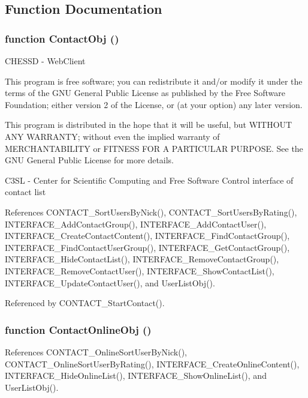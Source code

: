 \subsection{Function Documentation}
\subsubsection{\setlength{\rightskip}{0pt plus 5cm}function ContactObj ()}\label{interface_2contact_8js_befba56b856674055a8dfddbbbb0e72c}


CHESSD - WebClient

This program is free software; you can redistribute it and/or modify it under the terms of the GNU General Public License as published by the Free Software Foundation; either version 2 of the License, or (at your option) any later version.

This program is distributed in the hope that it will be useful, but WITHOUT ANY WARRANTY; without even the implied warranty of MERCHANTABILITY or FITNESS FOR A PARTICULAR PURPOSE. See the GNU General Public License for more details.

C3SL - Center for Scientific Computing and Free Software Control interface of contact list 

References CONTACT\_\-SortUsersByNick(), CONTACT\_\-SortUsersByRating(), INTERFACE\_\-AddContactGroup(), INTERFACE\_\-AddContactUser(), INTERFACE\_\-CreateContactContent(), INTERFACE\_\-FindContactGroup(), INTERFACE\_\-FindContactUserGroup(), INTERFACE\_\-GetContactGroup(), INTERFACE\_\-HideContactList(), INTERFACE\_\-RemoveContactGroup(), INTERFACE\_\-RemoveContactUser(), INTERFACE\_\-ShowContactList(), INTERFACE\_\-UpdateContactUser(), and UserListObj().

Referenced by CONTACT\_\-StartContact().
\subsubsection{\setlength{\rightskip}{0pt plus 5cm}function ContactOnlineObj ()}\label{interface_2contact_8js_8ecce5de98dc2f1b4dc46123cb05e381}




References CONTACT\_\-OnlineSortUserByNick(), CONTACT\_\-OnlineSortUserByRating(), INTERFACE\_\-CreateOnlineContent(), INTERFACE\_\-HideOnlineList(), INTERFACE\_\-ShowOnlineList(), and UserListObj().

